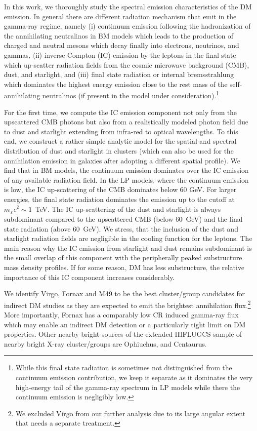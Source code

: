\documentclass[10pt,aps,pra,reprint,amsmath,amsfonts,amssymb,showpacs,nofootinbib,floatfix]{revtex4-1}
\begin{document}
In this work, we thoroughly study the spectral emission
characteristics of the DM emission. In general there are different
radiation mechanism that emit in the gamma-ray regime, namely (i)
continuum emission following the hadronization of the annihilating
neutralinos in BM models which leads to the production of charged and
neutral mesons which decay finally into electrons, neutrinos, and
gammas, (ii) inverse Compton (IC) emission by the leptons in the final
state which up-scatter radiation fields from the cosmic microwave
background (CMB), dust, and starlight, and (iii) final state radiation
or internal bremsstrahlung which dominates the highest energy emission
close to the rest mass of the self-annihilating neutralinos (if
present in the model under consideration).\footnote{While this final
  state radiation is sometimes not distinguished from the continuum
  emission contribution, we keep it separate as it dominates the very
  high-energy tail of the gamma-ray spectrum in LP models while there
  the continuum emission is negligibly low.}

For the first time, we compute the IC emission component not only from
the upscattered CMB photons but also from a realistically modeled
photon field due to dust and starlight extending from infra-red to
optical wavelengths. To this end, we construct a rather simple
analytic model for the spatial and spectral distribution of dust and
starlight in clusters (which can also be used for the annihilation
emission in galaxies after adopting a different spatial profile). We
find that in BM models, the continuum emission dominates over the IC
emission of any available radiation field. In the LP models, where the
continuum emission is low, the IC up-scattering of the CMB dominates
below 60 GeV. For larger energies, the final state radiation dominates
the emission up to the cutoff at $m_\chi c^2 \sim 1$~TeV. The IC
up-scattering of the dust and starlight is always subdominant compared
to the upscattered CMB (below 60~GeV) and the final state radiation
(above 60~GeV). We stress, that the inclusion of the dust and
starlight radiation fields are negligible in the cooling function for
the leptons. The main reason why the IC emission from starlight and
dust remains subdominant is the small overlap of this component with
the peripherally peaked substructure mass density profiles. If for
some reason, DM has less substructure, the relative importance of this
IC component increases considerably.

We identify Virgo, Fornax and M49 to be the best cluster/group
candidates for indirect DM studies as they are expected to emit the
brightest annihilation flux.\footnote{We excluded Virgo from our
  further analysis due to its large angular extent that needs a
  separate treatment.} More importantly, Fornax has a comparably low
CR induced gamma-ray flux which may enable an indirect DM detection or
a particularly tight limit on DM properties. Other nearby bright
sources of the extended HIFLUGCS sample of nearby bright X-ray
cluster/groups are Ophiuchus, and Centaurus.
\end{document}
